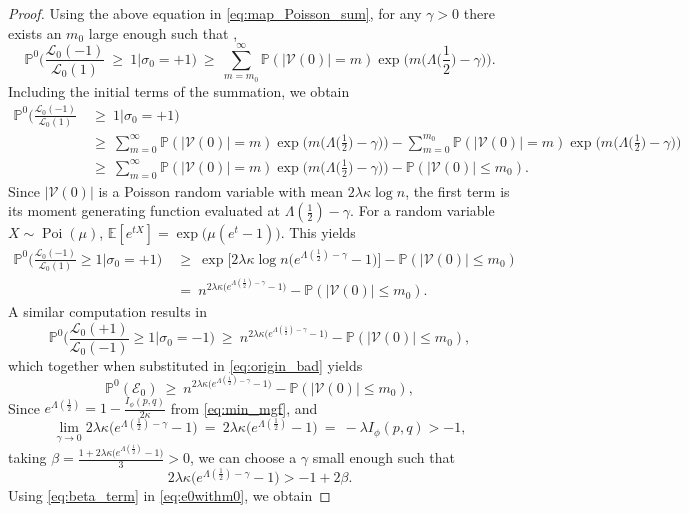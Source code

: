 \documentclass[letterpaper,11pt]{article}
\theoremstyle{definition}
\def\E{\mathbb{E}}
\def\P{\mathbb{P}}
\def\cE{\mathcal{E}}
\def\cL{\mathcal{L}}
\def\cV{\mathcal{V}}
\def\weq{ \ = \ }
\def\wge{ \ \ge \ }
\newcommand{\Poi}{\operatorname{Poi}}
\numberwithin{equation}{section}
\newcommand{\ga}{\gamma}
\newcommand{\ka}{\kappa}
\newcommand{\la}{\lambda}
\newcommand{\La}{\Lambda}
\theoremstyle{definition}
\def\E{\mathbb{E}}
\def\P{\mathbb{P}}
\def\cE{\mathcal{E}}
\def\cL{\mathcal{L}}
\def\cV{\mathcal{V}}
\def\weq{ \ = \ }
\def\wge{ \ \ge \ }
\newcommand{\Poi}{\operatorname{Poi}}
\numberwithin{equation}{section}
\newcommand{\ga}{\gamma}
\newcommand{\ka}{\kappa}
\newcommand{\la}{\lambda}
\newcommand{\La}{\Lambda}
\theoremstyle{thmstyletwo}%
\begin{document}
\begin{proof}
Using the above equation in \eqref{eq:map_Poisson_sum}, for any $\ga>0$ there exists an $m_0$ large enough such that ,
\[
 \P^0\Big( \frac{\cL_0(-1)}{\cL_0(1)}
 \wge 1\Big|\sigma_0=+1\Big)
 \wge \sum_{m=m_0}^\infty \P(|\cV(0)|=m) \exp\Big(m\Big(\La\Big(\frac{1}{2}\Big)-\ga\Big)\Big). 
\]
Including the initial terms of the summation, we obtain
\begin{align*}
 \P^0\Big( \frac{\cL_0(-1)}{\cL_0(1)} 
 &\wge 1 \Big|\sigma_0=+1\Big)\\
 &\wge  \sum_{m=0}^\infty \P(|\cV(0)|=m)\exp\Big(m\Big(\La\Big(\frac{1}{2}\Big)-\ga\Big)\Big) - \sum_{m=0}^{m_0} \P(|\cV(0)|=m)\exp\Big(m\Big(\La\Big(\frac{1}{2}\Big)-\ga\Big)\Big)\\
 &\wge \sum_{m=0}^\infty \P(|\cV(0)|=m)
  \exp\Big(m\Big(\La\Big(\frac{1}{2}\Big)-\ga\Big)\Big) - \P(|\cV(0)| \le m_0).
\end{align*}
Since $|\cV(0)|$ is a Poisson random variable with mean $2 \la \ka \log n$,
the first term is its moment generating function evaluated at
$\La(\frac{1}{2})-\ga$.
For a random variable $X\sim \Poi(\mu)$,
$\E[e^{tX}] = \exp\big(\mu (e^t-1)\big)$. 
This yields
\begin{align*}
 \P^0\Big( \frac{\cL_0(-1)}{\cL_0(1)} \ge 1\Big|\sigma_0=+1\Big)
 &\wge \exp\Big[2 \la \ka \log n \big(e^{\La(\frac{1}{2})-\ga}-1\big) \Big]-\P(|\cV(0)| \le m_0)\\ 
 &\weq n^{2 \la \ka \big(e^{\La(\frac{1}{2})-\ga}-1\big)} -\P(|\cV(0)| \le m_0).
\end{align*}
A similar computation results in 
\[
 \P^0\Big( \frac{\cL_0(+1)}{\cL_0(-1)} \ge 1\Big|\sigma_0=-1\Big)
 \wge n^{2 \la \ka \big(e^{\La(\frac{1}{2})-\ga}-1\big)} -\P(|\cV(0)| \le m_0),
\]
which together when substituted in \eqref{eq:origin_bad} yields 
\begin{equation}
 \label{eq:e0withm0}
 \P^0(\cE_0 )
 \wge n^{2 \la \ka \big(e^{\La(\frac{1}{2})-\ga}-1\big)} -\P(|\cV(0)| \le m_0),
\end{equation}
Since $e^{\La(\frac{1}{2})} =1-\frac{I_{\phi}(p,q)}{2\ka}$ from \eqref{eq:min_mgf}, and 
\[
\lim_{\ga \to 0} 2 \la \ka \big(e^{\La(\frac{1}{2})-\ga}-1\big) \weq 2 \la \ka \big(e^{\La(\frac{1}{2})}-1\big) \weq -\la I_{\phi}(p,q)>-1,
\]
taking $\beta = \frac{1+2 \la \ka \big(e^{\La(\frac{1}{2})}-1\big)}{3} > 0$, we can choose a $\ga$ small enough such that 
\begin{equation}
2 \la \ka \big(e^{\La(\frac{1}{2})-\ga}-1\big) > -1+2\beta.
\label{eq:beta_term}
\end{equation}
Using \eqref{eq:beta_term} in \eqref{eq:e0withm0}, we obtain 

\end{proof}
\end{document}
